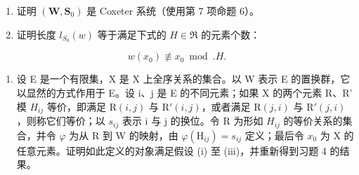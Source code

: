 \begin{enumerate}
\def\labelenumi{\alph{enumi})}
\item
  证明 \((\mathbf{W},\mathbf{S}_0)\) 是 Coxeter 系统（使用第 7 项命题 6）。
\item
  证明长度 \(l_{S_0}(w)\) 等于满足下式的 \(H \in \mathfrak{R}\) 的元素个数：
\end{enumerate}

\[
w (x _ {0}) \not \equiv x _ {0} \bmod . H.
\]

\begin{enumerate}
\def\labelenumi{\alph{enumi})}
\setcounter{enumi}{2}
\tightlist
\item
  设 E 是一个有限集，X 是 X 上全序关系的集合。以 W 表示 E 的置换群，它以显然的方式作用于 E。设 i、j 是 E 的不同元素；如果 X 的两个元素 R、R' 模 \(H_{ij}\) 等价，即满足 \(\mathrm{R}(i,j)\) 与 \(\mathrm{R}'(i,j)\)，或者满足 \(\mathrm{R}(j,i)\) 与 \(\mathrm{R}'(j,i)\)，则称它们等价；以 \(s_{ij}\) 表示 i 与 j 的换位。令 R 为形如 \(H_{ij}\) 的等价关系的集合，并令 \(\varphi\) 为从 R 到 W 的映射，由 \(\varphi(\mathrm{H}_{ij}) = s_{ij}\) 定义；最后令 \(x_{0}\) 为 X 的任意元素。证明如此定义的对象满足假设 (i) 至 (iii)，并重新得到习题 4 的结果。
\end{enumerate}

